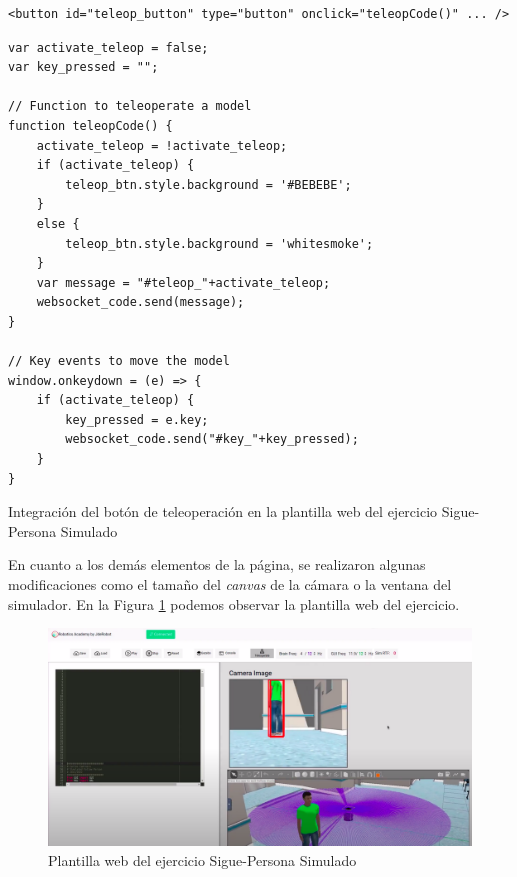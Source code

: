\begin{code}[H]
\begin{lstlisting}
<button id="teleop_button" type="button" onclick="teleopCode()" ... />
\end{lstlisting}
\begin{lstlisting}
var activate_teleop = false;
var key_pressed = "";

// Function to teleoperate a model
function teleopCode() {
	activate_teleop = !activate_teleop;
	if (activate_teleop) {
		teleop_btn.style.background = '#BEBEBE';
	}
	else {
		teleop_btn.style.background = 'whitesmoke';
	}
	var message = "#teleop_"+activate_teleop;
	websocket_code.send(message);
}

// Key events to move the model
window.onkeydown = (e) => {
	if (activate_teleop) {
    	key_pressed = e.key;
		websocket_code.send("#key_"+key_pressed);
	}
}
\end{lstlisting}
\caption[Integración del botón de Teleoperación en la plantilla web del ejercicio Sigue-Persona Simulado]{Integración del botón de teleoperación en la plantilla web del ejercicio Sigue-Persona Simulado}
\label{cod:teleoperacion_plantilla}
\end{code}

En cuanto a los demás elementos de la página, se realizaron algunas modificaciones como el tamaño del \textit{canvas} de la cámara o la ventana del simulador. En la Figura \ref{fig:plantilla_web_simulated_follow_person} podemos observar la plantilla web del ejercicio.\\

\begin{figure} [H]
  \begin{center}
    \includegraphics[width=15cm]{imagenes/cap5/plantilla-web-simulated-follow-person.png}
  \end{center}
  \caption[Plantilla web del ejercicio Sigue-Persona Simulado]{Plantilla web del ejercicio Sigue-Persona Simulado}
  \label{fig:plantilla_web_simulated_follow_person}
\end{figure}\

